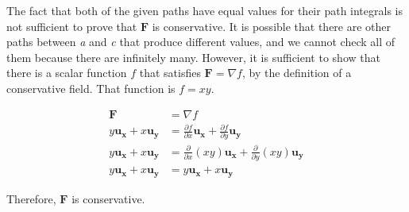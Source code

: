 \documentclass{article}
\begin{document}
The fact that both of the given paths have equal values for their path integrals is not sufficient to prove that
$\mathbf{F}$ is conservative. It is possible that there are other paths between \textit{a} and \textit{c} that produce
different values, and we cannot check all of them because there are infinitely many. However, it is sufficient to show
that there is a scalar function $f$ that satisfies $\mathbf{F} = \nabla f$, by the definition of a conservative field.
That function is $f = xy$.

\begin{equation*}
	\begin{split}
		\mathbf{F} & = \nabla f \\
		y\mathbf{u_x} + x\mathbf{u_y} & = \frac{\partial f}{\partial x}\mathbf{u_x} + \frac{\partial f}{\partial y}\mathbf{u_y} \\
		y\mathbf{u_x} + x\mathbf{u_y} & = \frac{\partial}{\partial x}(xy)\mathbf{u_x} + \frac{\partial}{\partial y}(xy)\mathbf{u_y} \\
		y\mathbf{u_x} + x\mathbf{u_y} & = y\mathbf{u_x} + x\mathbf{u_y}
	\end{split}
\end{equation*}

Therefore, $\mathbf{F}$ is conservative.
\end{document}
